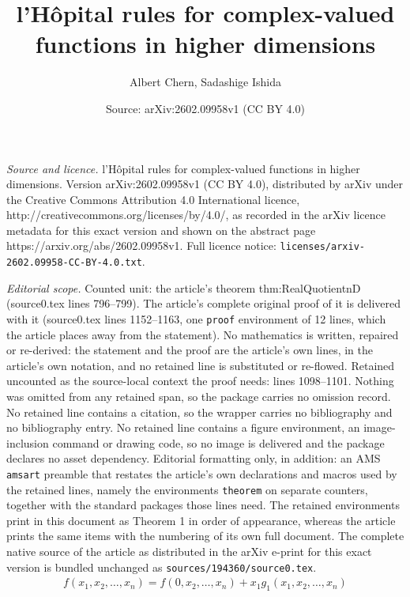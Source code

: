 \documentclass[10pt,a4paper]{amsart}
\title{l'H\^opital rules for complex-valued functions in higher dimensions}
\author{Albert Chern, Sadashige Ishida}
\date{Source: arXiv:2602.09958v1 (CC BY 4.0)}
\begin{document}
\maketitle

\noindent\emph{Source and licence.} l'H\^opital rules for complex-valued functions in higher dimensions. Version arXiv:2602.09958v1 (CC BY 4.0), distributed by arXiv under the Creative Commons Attribution 4.0 International licence, http://creativecommons.org/licenses/by/4.0/, as recorded in the arXiv licence metadata for this exact version and shown on the abstract page https://arxiv.org/abs/2602.09958v1. Full licence notice: \texttt{licenses/arxiv-2602.09958-CC-BY-4.0.txt}.\par\smallskip

\noindent\textit{Editorial scope.} Counted unit: the article's theorem thm:RealQuotientnD (source0.tex lines 796--799). The article's complete original proof of it is delivered with it (source0.tex lines 1152--1163, one \texttt{proof} environment of 12 lines, which the article places away from the statement). No mathematics is written, repaired or re-derived: the statement and the proof are the article's own lines, in the article's own notation, and no retained line is substituted or re-flowed.  Retained uncounted as the source-local context the proof needs: lines 1098--1101.  Nothing was omitted from any retained span, so the package carries no omission record.  No retained line contains a citation, so the wrapper carries no bibliography and no bibliography entry.  No retained line contains a figure environment, an image-inclusion command or drawing code, so no image is delivered and the package declares no asset dependency.  Editorial formatting only, in addition: an AMS \texttt{amsart} preamble that restates the article's own declarations and macros used by the retained lines, namely the environments \texttt{theorem} on separate counters, together with the standard packages those lines need.  The retained environments print in this document as Theorem 1 in order of appearance, whereas the article prints the same items with the numbering of its own full document.  The complete native source of the article as distributed in the arXiv e-print for this exact version is bundled unchanged as \texttt{sources/194360/source0.tex}.
\begin{align}
\label{eq:WhitneyTowardsMultidiemsion}
        f(x_1,x_2,\ldots,x_n) = f(0,x_2,\ldots,x_n) + x_1 g_1(x_1,x_2,\ldots,x_n)
\end{align}
\end{document}
